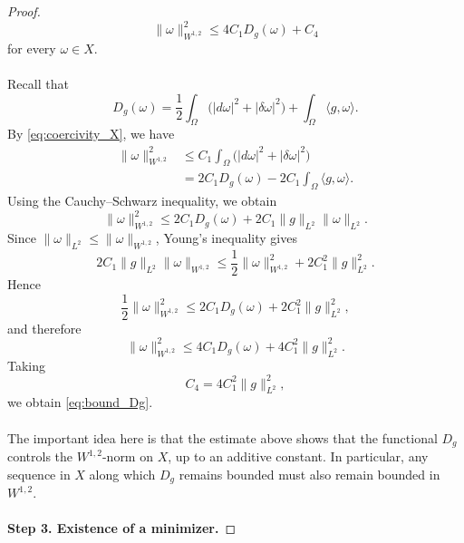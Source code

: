\begin{proof}
\begin{equation}\label{eq:bound_Dg}
    \|\omega\|_{W^{1,2}}^2
    \leq
    4C_1D_g(\omega)+C_4
\end{equation}
for every $\omega\in X$.
\\\\ Recall that
\[
    D_g(\omega)
    =
    \frac12\int_\Omega
    \bigl(|d\omega|^2+|\delta\omega|^2\bigr)
    +\int_\Omega\langle g,\omega\rangle.
\]
By \eqref{eq:coercivity_X}, we have
\[
    \begin{aligned}
    \|\omega\|_{W^{1,2}}^2
    &\leq
    C_1\int_\Omega
    \bigl(|d\omega|^2+|\delta\omega|^2\bigr)\\
    &=2C_1D_g(\omega)
    -2C_1\int_\Omega\langle g,\omega\rangle.
    \end{aligned}
\]
Using the Cauchy--Schwarz inequality, we obtain
\[
    \|\omega\|_{W^{1,2}}^2
    \leq
    2C_1D_g(\omega)
    +2C_1\|g\|_{L^2}\|\omega\|_{L^2}.
\]
Since $\|\omega\|_{L^2}\leq\|\omega\|_{W^{1,2}}$, Young's inequality
gives
\[
    2C_1\|g\|_{L^2}\|\omega\|_{W^{1,2}}
    \leq
    \frac12\|\omega\|_{W^{1,2}}^2
    +2C_1^2\|g\|_{L^2}^2.
\]
Hence
\[
    \frac12\|\omega\|_{W^{1,2}}^2
    \leq
    2C_1D_g(\omega)+2C_1^2\|g\|_{L^2}^2,
\]
and therefore
\[
    \|\omega\|_{W^{1,2}}^2
    \leq
    4C_1D_g(\omega)+4C_1^2\|g\|_{L^2}^2.
\]
Taking
\[
    C_4=4C_1^2\|g\|_{L^2}^2,
\]
we obtain \eqref{eq:bound_Dg}.
\\\\ The important idea here is that the estimate above shows that the functional
$D_g$ controls the $W^{1,2}$-norm on $X$, up to an additive constant.
In particular, any sequence in $X$ along which $D_g$ remains bounded
must also remain bounded in $W^{1,2}$.
\\\\ \textbf{Step 3. Existence of a minimizer.}


\end{proof}
